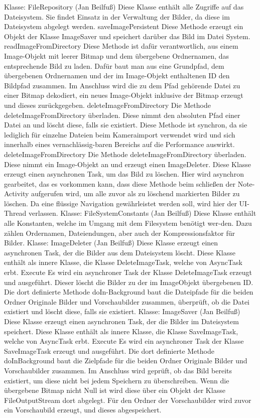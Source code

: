 Klasse: FileRepository (Jan Beilfuß)
Diese Klasse enthält alle Zugriffe auf das Dateisystem. Sie findet Einsatz in der Verwaltung der Bilder, da diese im Dateisystem abgelegt werden.
saveImagePersistent
Diese Methode erzeugt ein Objekt der Klasse ImageSaver und speichert darüber das Bild im Datei System.
readImageFromDirectory
Diese Methode ist dafür verantwortlich, aus einem Image-Objekt mit leerer Bitmap und dem übergebene Ordnernamen, das entsprechende Bild zu laden. Dafür baut man aus eine Grundpfad, dem übergebenen Ordnernamen und der im Image-Objekt enthaltenen ID den Bildpfad zusammen. Im Anschluss wird die zu dem Pfad gehörende Datei zu einer Bitmap dekodiert, ein neues Image-Objekt inklusive der Bitmap erzeugt und dieses zurückgegeben.
deleteImageFromDirectory
Die Methode deleteImageFromDirectory überladen. Diese nimmt den absoluten Pfad einer Datei an und löscht diese, falls sie existiert. Diese Methode ist synchron, da sie lediglich für einzelne Dateien beim Kameraimport verwendet wird und sich innerhalb eines vernachlässig-baren Bereichs auf die Performance auswirkt.
deleteImageFromDirectory
Die Methode deleteImageFromDirectory überladen. Diese nimmt ein Image-Objekt an und erzeugt einen ImageDeleter. Diese Klasse erzeugt einen asynchronen Task, um das Bild zu löschen. Hier wird asynchron gearbeitet, das es vorkommen kann, dass diese Methode beim schließen der Note-Activity aufgerufen wird, um alle zuvor als zu löschend markierten Bilder zu löschen. Da eine flüssige Navigation gewährleistet werden soll, wird hier der UI-Thread verlassen.
Klasse: FileSystemConstants (Jan Beilfuß)
Diese Klasse enthält alle Konstanten, welche im Umgang mit dem Filesystem benötigt wer-den. Dazu zählen Ordernamen, Dateiendungen, aber auch der Kompressionsfaktor für Bilder.
Klasse: ImageDeleter (Jan Beilfuß)
Diese Klasse erzeugt einen asynchronen Task, der die Bilder aus dem Dateisystem löscht. Diese Klasse enthält als innere Klasse, die Klasse DeleteImageTask, welche von AsyncTask erbt.
Execute
Es wird ein asynchroner Task der Klasse DeleteImageTask erzeugt und ausgeführt. Dieser löscht die Bilder zu der im ImageObjekt übergebenen ID. Die dort definierte Methode doIn-Background baut die Dateipfade für die beiden Ordner Originale Bilder und Vorschaubilder zusammen, überprüft, ob die Datei existiert und löscht diese, falls sie existiert.
Klasse: ImageSaver (Jan Beilfuß)
Diese Klasse erzeugt einen asynchronen Task, der die Bilder im Dateisystem speichert. Diese Klasse enthält als innere Klasse, die Klasse SaveImageTask, welche von AsyncTask erbt.
Execute
Es wird ein asynchroner Task der Klasse SaveImageTask erzeugt und ausgeführt. Die dort definierte Methode doInBackground baut die Zielpfade für die beiden Ordner Originale Bilder und Vorschaubilder zusammen. Im Anschluss wird geprüft, ob das Bild bereits existiert, um diese nicht bei jedem Speichern zu überschreiben. Wenn die übergebene Bitmap nicht Null ist wird diese über ein Objekt der Klasse FileOutputStream dort abgelegt. Für den Ordner der Vorschaubilder wird zuvor ein Vorschaubild erzeugt, und dieses abgespeichert.


